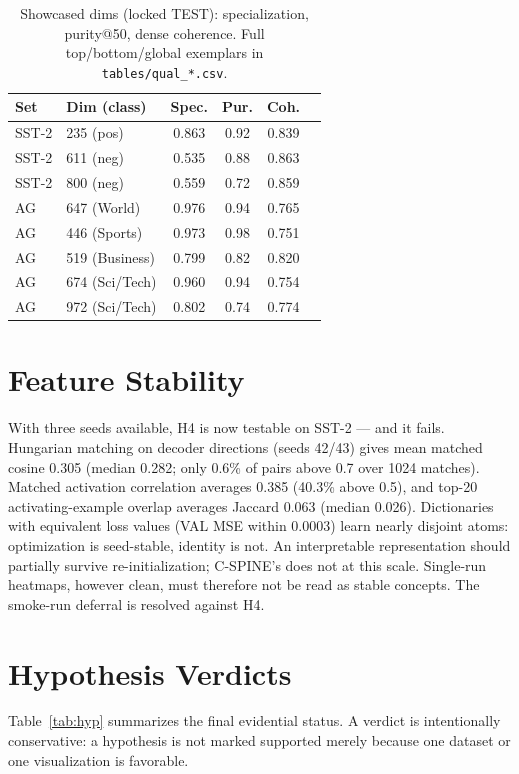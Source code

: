 \documentclass[conference]{IEEEtran}
\begin{document}
\begin{table}[t]
\caption{Showcased dims (locked TEST): specialization, purity@50, dense coherence. Full top/bottom/global exemplars in \texttt{tables/qual\_*.csv}.}
\label{tab:qual}
\centering
\begin{tabular}{llcccc}
\hline
\textbf{Set} & \textbf{Dim (class)} & \textbf{Spec.} & \textbf{Pur.} & \textbf{Coh.} \\
\hline
SST-2 & 235 (pos) & 0.863 & 0.92 & 0.839 \\
SST-2 & 611 (neg) & 0.535 & 0.88 & 0.863 \\
SST-2 & 800 (neg) & 0.559 & 0.72 & 0.859 \\
AG & 647 (World) & 0.976 & 0.94 & 0.765 \\
AG & 446 (Sports) & 0.973 & 0.98 & 0.751 \\
AG & 519 (Business) & 0.799 & 0.82 & 0.820 \\
AG & 674 (Sci/Tech) & 0.960 & 0.94 & 0.754 \\
AG & 972 (Sci/Tech) & 0.802 & 0.74 & 0.774 \\
\hline
\end{tabular}
\end{table}

\section{Feature Stability}
\label{sec:stability}
With three seeds available, H4 is now testable on SST-2 --- and it fails.
Hungarian matching on decoder directions (seeds 42/43) gives mean matched
cosine 0.305 (median 0.282; only 0.6\% of pairs above 0.7 over 1024
matches). Matched activation correlation averages 0.385 (40.3\% above 0.5),
and top-20 activating-example overlap averages Jaccard 0.063 (median
0.026). Dictionaries with equivalent loss values (VAL MSE within 0.0003)
learn nearly disjoint atoms: optimization is seed-stable, identity is not.
An interpretable representation should partially survive
re-initialization; C-SPINE's does not at this scale. Single-run heatmaps,
however clean, must therefore not be read as stable concepts. The
smoke-run deferral is resolved against H4.

\section{Hypothesis Verdicts}
\label{sec:hyp}
Table~\ref{tab:hyp} summarizes the final evidential status. A verdict is
intentionally conservative: a hypothesis is not marked supported merely
because one dataset or one visualization is favorable.
\end{document}
